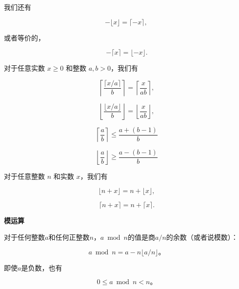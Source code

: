 \documentclass[lang=cn,newtx,10pt,scheme=chinese]{elegantbook}
\begin{document}
我们还有

\begin{equation}\label{eq:3.3}
-\lfloor x\rfloor=\lceil-x\rceil \text {, }
\end{equation}

或者等价的，

\begin{equation}\label{eq:3.4}
-\lceil x\rceil=\lfloor-x\rfloor .
\end{equation}

对于任意实数 $x \geq 0$ 和整数 $a, b>0$，我们有

\begin{equation}\label{eq:3.5}
\left\lceil\frac{\lceil x / a\rceil}{b}\right\rceil=\left\lceil\frac{x}{a b}\right\rceil,
\end{equation}

\begin{equation}\label{eq:3.6}
\left\lfloor\frac{\lfloor x / a\rfloor}{b}\right\rfloor=\left\lfloor\frac{x}{a b}\right\rfloor,
\end{equation}

\begin{equation}\label{eq:3.7}
\left\lceil\frac{a}{b}\right\rceil \leq \frac{a+(b-1)}{b}
\end{equation}

\begin{equation}\label{eq:3.8}
\left\lfloor\frac{a}{b}\right\rfloor \geq \frac{a-(b-1)}{b}
\end{equation}

对于任意整数 $n$ 和实数 $x$，我们有

\begin{equation}\label{eq:3.9}
\lfloor n+x\rfloor=n+\lfloor x\rfloor,
\end{equation}

\begin{equation}\label{eq:3.10}
\lceil n+x\rceil=n+\lceil x\rceil .
\end{equation}

\textbf{模运算}

对于任何整数$a$和任何正整数$n$，$a \bmod n$的值是商$a / n$的余数（或者说模数）：

\begin{equation}\label{eq:3.11}
a \bmod n=a-n\lfloor a / n\rfloor。
\end{equation}

即使$a$是负数，也有

\begin{equation}\label{eq:3.12}
0 \leq a \bmod n<n。
\end{equation}
\end{document}

